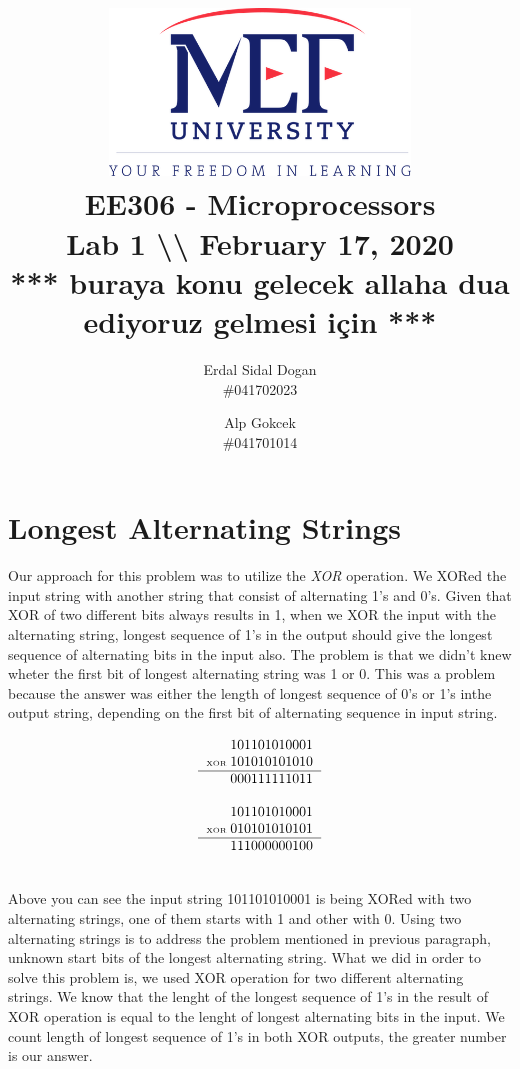 \documentclass[titlepage]{article}
\date{}
\author{Erdal Sidal Dogan\\ \#041702023  \and Alp
	Gokcek \\ \#041701014}
\title{\includegraphics[width=0.6\textwidth]{../images/logo_en_color.png}\\ 
\vspace{3em}
EE306 - Microprocessors\\
\vspace{2em}
\textbf{Lab 1 \textbackslash\textbackslash{}
February 17, 2020}\\
*** buraya konu gelecek allaha dua ediyoruz gelmesi için ***}
\begin{document}
	\maketitle
	\section{Longest Alternating Strings}
	Our approach for this problem was to utilize the \emph{XOR} operation. We XORed the input string with another string that consist of alternating 1's and 0's. Given that XOR of two different bits always results in 1, when we XOR the input  with the alternating string, longest sequence of 1's in the output should give the longest sequence of alternating bits in the input also. The problem is that we didn't knew wheter the first bit of longest alternating string was 1 or 0.  This was a problem because the answer was either the length of longest sequence of 0's or 1's inthe output string, depending on the first bit of alternating sequence in input string.  \\
	
	\begin{minipage}{0.5\textwidth}
		\begin{equation*}
			\begin{tabular}{r@{\;}r}
				& 101101010001  \\
				\tiny{XOR} & 101010101010\\
				\hline
				& 000111111011
			\end{tabular}
		\end{equation*}
	\end{minipage}
	\quad
	\begin{minipage}{0.35\textwidth}
		\begin{equation*}
				\begin{tabular}{r@{\;}r}
				& 101101010001  \\
				\tiny{XOR} & 010101010101\\
				\hline
				& 111000000100
			\end{tabular}
		\end{equation*}
	\end{minipage}
	\\

	Above you can see the input string 101101010001 is being XORed with two alternating strings, one of them starts with 1 and other with 0. Using two alternating strings is to address the problem mentioned in previous paragraph, unknown start bits of the longest alternating string. What we did in order to solve this problem is, we used XOR operation for two different alternating strings. We know that the lenght of the longest sequence of 1's in the result of XOR operation is equal to the lenght of longest alternating bits in the input. We count length of longest sequence of 1's in both XOR outputs, the greater number is our answer.\\
	
\end{document}
